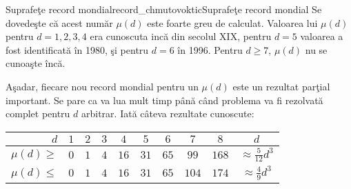 \begin{surferIntroPage}{Suprafe\c{t}e record mondial}{record_chmutovoktic}{Suprafe\c{t}e record mondial}
   Se dovede\c{s}te c\u{a} acest num\u{a}r $\mu(d)$ este foarte greu de calculat.
   Valoarea lui $\mu(d)$ pentru $d=1,2,3,4$ era cunoscuta inc\u{a} din secolul XIX,
   pentru $d=5$ valoarea a fost identificat\u{a} \^{i}n 1980, \c{s}i pentru $d=6$ \^{i}n 1996.
   Pentru $d\ge 7$, $\mu(d)$ nu se cunoa\c{s}te \^{i}nc\u{a}.

   A\c{s}adar, fiecare nou record mondial pentru un $\mu(d)$ este un rezultat par\c{t}ial important.
   Se pare ca va lua mult timp p\^{a}n\u{a} c\^{a}nd problema va fi rezolvat\u{a} complet pentru $d$
   arbitrar. Iat\u{a} c\^{a}teva rezultate cunoscute:

   \begin{center}
      \begin{tabular}{r|cccccccc|c}
        $d$ & $1$ & $2$ & $3$ & $4$ & $5$ & $6$ & $7$ & $8$ & $d$\\
        \hline
        \hline
        \rule{0pt}{1.2em}$\mu(d)\ge$ & $0$ & $1$ & $4$ & $16$ & $31$ & $65$ &
        $99$ & $168$ &
        $\approx \frac{5}{12}d^3$\\[0.3em]
        \hline
        \rule{0pt}{1.2em}$\mu(d)\le$ & $0$ & $1$ & $4$ & $16$ & $31$ & $65$ &
        $104$ & $174$ & $\approx \frac{4}{9}d^3$
      \end{tabular}
    \end{center}
\end{surferIntroPage}
